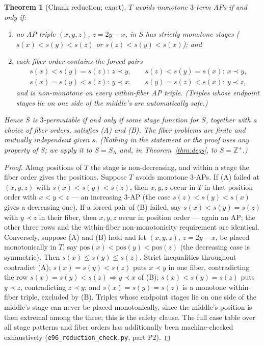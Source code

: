 \documentclass[11pt]{article}
\newtheorem{theorem}{Theorem}
\theoremstyle{definition}
\newcommand{\Z}{\mathbb{Z}}
\newcommand{\SA}{S_{\mathrm{A}}}
\newcommand{\pos}{\mathrm{pos}}
\begin{document}
\begin{theorem}[Chunk reduction; exact]\label{thm:chunk}
$T$ avoids monotone $3$-term APs if and only if:
\begin{enumerate}
\item[(A)] no AP triple $(x,y,z)$, $z=2y-x$, in $S$ has strictly monotone
stages ($s(x)<s(y)<s(z)$ or $s(z)<s(y)<s(x)$); and
\item[(B)] each fiber order contains the \emph{forced pairs}
\[
\begin{array}{ll}
s(x)<s(y)=s(z):\ z \prec y, &\quad s(z)<s(y)=s(x):\ x \prec y,\\
s(x)=s(y)<s(z):\ y \prec x, &\quad s(y)=s(z)<s(x):\ y \prec z,
\end{array}
\]
and is non-monotone on every within-fiber AP triple. (Triples whose endpoint
stages lie on one side of the middle's are automatically safe.)
\end{enumerate}
Hence $S$ is $3$-permutable if and only if some stage function for $S$,
together with a choice of fiber orders, satisfies
(A) and (B). The fiber problems are finite and mutually independent given
$s$. (Nothing in the statement or the proof uses any property of $S$; we
apply it to $S = \SA$ and, in Theorem~\ref{thm:degs}, to $S = \Z^+$.)
\end{theorem}

\begin{proof}
Along positions of $T$ the stage is non-decreasing, and within a stage the
fiber order gives the positions. Suppose $T$ avoids monotone $3$-APs. If
(A) failed at $(x,y,z)$ with $s(x)<s(y)<s(z)$, then $x,y,z$ occur in $T$ in
that position order with $x<y<z$ --- an increasing $3$-AP (the case
$s(z)<s(y)<s(x)$ gives a decreasing one). If a forced pair of (B) failed,
say $s(x)<s(y)=s(z)$ with $y \prec z$ in their fiber, then $x, y, z$ occur
in position order --- again an AP; the other three rows and the within-fiber
non-monotonicity requirement are identical. Conversely, suppose (A) and (B)
hold and let $(x,y,z)$, $z = 2y-x$, be placed monotonically in $T$, say
$\pos(x)<\pos(y)<\pos(z)$ (the decreasing case is symmetric). Then
$s(x) \le s(y) \le s(z)$. Strict inequalities throughout contradict (A);
$s(x)=s(y)<s(z)$ puts $x \prec y$ in one fiber, contradicting the row
$s(x)=s(y)<s(z) \Rightarrow y \prec x$ of (B); $s(x)<s(y)=s(z)$ puts
$y \prec z$, contradicting $z \prec y$; and $s(x)=s(y)=s(z)$ is a monotone
within-fiber triple, excluded by (B). Triples whose endpoint stages lie on
one side of the middle's stage can never be placed monotonically, since the
middle's position is then extremal among the three; this is the safety
clause. The full case table over all stage patterns and fiber orders has
additionally been machine-checked exhaustively
(\texttt{e96\_reduction\_check.py}, part P2).
\end{proof}
\end{document}
